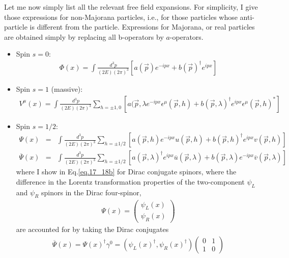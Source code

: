 \documentclass[12pt]{article}
\def\dgr{\dagger}
\def\eps{\epsilon}
\begin{document}
  Let me now simply list all the relevant free field expansions. For
  simplicity, I give those expressions for non-Majorana particles, i.e.,
  for those particles whose anti-particle is different from the particle.
  Expressions for Majorana, or real particles are obtained simply by
  replacing all b-operators by $a$-operators.
\begin{itemize}
  \item Spin $s=0$:
  \begin{eqnarray}
    \Phi(x)
  = \int \frac{d^3p}{(2E)(2\pi)^3} [ a({\vec p}) e^{-ipx} + b({\vec p})^\dgr e^{ipx} ]\label{eq.17_15}
  \end{eqnarray}
  \item Spin $s=1$ (massive):
  \begin{eqnarray}
    V^\mu(x)
  = \int  \frac{d^3p}{(2E)(2\pi)^3}
    \sum_{h=\pm1,0}
    [ a({\vec p},\lambda e^{-ipx} \eps^\mu({\vec p},h)
    + b({\vec p},\lambda)^\dgr e^{ipx}  \eps^\mu({\vec p},h)^* ] \label{eq.17_16}
  \end{eqnarray}
  \item Spin $s=1/2$:
  \begin{eqnarray}
    \Psi(x) &=& \int \frac{d^3p}{(2E)(2\pi)^3}
    \sum_{h=\pm1/2}
     [a({\vec p},h)      e^{-ipx} u({\vec p},h)
    + b({\vec p},h)^\dgr e^{ipx}  v({\vec p},h) ] \label{eq.17_18a} \\
    {\overline \Psi}(x)
  &=& \int \frac{d^3p}{(2E)(2\pi)^3}
    \sum_{h=\pm1/2}
    [a({\vec p},\lambda)^\dgr e^{ipx}  {\overline u}({\vec p},\lambda)
    + b({\vec p},\lambda)      e^{-ipx} {\overline v}({\vec p},\lambda)] \label{eq.17_18b}
  \end{eqnarray}
  where I show in Eq.\ref{eq.17_18b} for Dirac conjugate spinors, where the difference in the Lorentz transformation properties of the two-component
  $\psi_L$ and $\psi_R$ spinors in the Dirac four-spinor,
\begin{eqnarray}
    \Psi(x) =
  \begin{pmatrix}
    \psi_L(x) \\ \psi_R(x)
  \end{pmatrix} \label{eq.17_19}
\end{eqnarray}
are accounted for by taking the Dirac conjugates
\begin{eqnarray}
  {\overline \Psi}(x) = \Psi(x)^\dgr \gamma^0
  = ( \psi_L(x)^\dgr, \psi_R(x)^\dgr ) 
  \begin{pmatrix}
    0 & 1 \\
    1 & 0
  \end{pmatrix}

\end{eqnarray}
\end{itemize}
\end{document}
